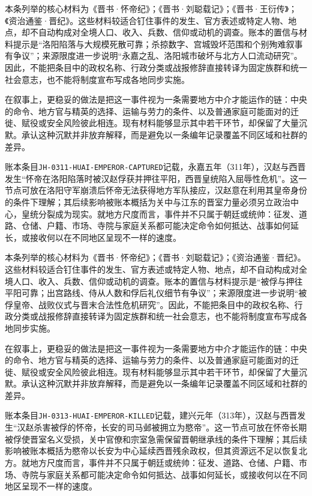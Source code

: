 本条列举的核心材料为《晋书·怀帝纪》；《晋书·刘聪载记》；《晋书·王衍传》；《资治通鉴·晋纪》。这些材料较适合钉住事件的发生、官方表述或特定人物、地点，却不自动构成对全境人口、收入、兵数、信仰或动机的调查。账本的置信与材料提示是“洛阳陷落与大规模死散可靠；杀掠数字、宫城毁坏范围和个别殉难叙事有争议”；来源限度进一步说明“永嘉之乱、洛阳城市破坏与北方人口流动研究”。因此，不能把条目中的政权名称、行政分类或战报修辞直接转译为固定族群和统一社会意志，也不能将制度宣布写成各地同步实施。

在叙事上，更稳妥的做法是把这一事件视为一条需要地方中介才能运作的链：中央的命令、地方官与精英的选择、运输与劳力的条件、以及普通家庭可能面对的迁徙、赋役或安全风险彼此相连。现有材料能够显示其中若干环节，却保留了大量沉默。承认这种沉默并非放弃解释，而是避免以一条编年记录覆盖不同区域和社群的差异。

账本条目\texttt{JH-0311-HUAI-EMPEROR-CAPTURED}记载，永嘉五年（311年），汉赵与西晋发生“怀帝在洛阳陷落时被汉赵俘获并押往平阳，西晋皇统陷入屈辱性危机”。这一节点可放在洛阳守军崩溃后怀帝无法获得地方军队接应，汉赵意在利用其皇帝身份的条件下理解；其后续影响被账本概括为关中与江东的晋室力量必须另立政治中心，皇统分裂成为现实。就地方尺度而言，事件并不只属于朝廷或统帅：征发、道路、仓储、户籍、市场、寺院与家庭关系都可能决定命令如何抵达、战事如何延长，或接收何以在不同地区呈现不一样的速度。

本条列举的核心材料为《晋书·怀帝纪》；《晋书·刘聪载记》；《资治通鉴·晋纪》。这些材料较适合钉住事件的发生、官方表述或特定人物、地点，却不自动构成对全境人口、收入、兵数、信仰或动机的调查。账本的置信与材料提示是“被俘与押往平阳可靠；出宫路线、侍从人数和俘后礼仪细节有争议”；来源限度进一步说明“被俘皇帝、战败仪式与晋末合法性危机研究”。因此，不能把条目中的政权名称、行政分类或战报修辞直接转译为固定族群和统一社会意志，也不能将制度宣布写成各地同步实施。

在叙事上，更稳妥的做法是把这一事件视为一条需要地方中介才能运作的链：中央的命令、地方官与精英的选择、运输与劳力的条件、以及普通家庭可能面对的迁徙、赋役或安全风险彼此相连。现有材料能够显示其中若干环节，却保留了大量沉默。承认这种沉默并非放弃解释，而是避免以一条编年记录覆盖不同区域和社群的差异。

账本条目\texttt{JH-0313-HUAI-EMPEROR-KILLED}记载，建兴元年（313年），汉赵与西晋发生“汉赵杀害被俘的怀帝，长安的司马邺被拥立为愍帝”。这一节点可放在怀帝长期被俘使晋室名义受损，关中官僚和宗室急需保留晋朝继承线的条件下理解；其后续影响被账本概括为愍帝以长安为中心延续西晋残余政权，但其资源远不足以恢复北方。就地方尺度而言，事件并不只属于朝廷或统帅：征发、道路、仓储、户籍、市场、寺院与家庭关系都可能决定命令如何抵达、战事如何延长，或接收何以在不同地区呈现不一样的速度。

